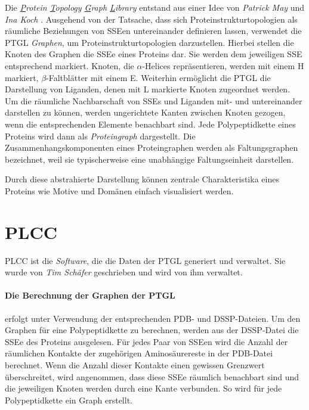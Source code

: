 \documentclass{report}
\begin{document}
Die \textit{\underline{P}rotein \underline{T}opology \underline{G}raph \underline{L}ibrary} entstand aus einer Idee von \textit{Patrick May} und \textit{Ina Koch} \cite{ptgl1}. Ausgehend von der Tatsache, dass sich Proteinstrukturtopologien als r\"aumliche Beziehungen von SSEen untereinander definieren lassen, verwendet die PTGL \emph{Graphen}, um Proteinstrukturtopologien darzustellen.
Hierbei stellen die Knoten des Graphen die SSEe eines Proteins dar. Sie werden dem jeweiligen SSE entsprechend markiert. Knoten, die $\alpha$-Helices repr\"asentieren, werden mit einem H markiert, $\beta$-Faltbl\"atter mit einem E. Weiterhin erm\"oglicht die PTGL die Darstellung von Liganden, \cite{vplg} denen mit L markierte Knoten zugeordnet werden. Um die r\"aumliche Nachbarschaft von SSEs und Liganden mit- und untereinander darstellen zu k\"onnen, werden ungerichtete Kanten zwischen Knoten gezogen, wenn die entsprechenden Elemente benachbart sind. Jede Polypeptidkette eines Proteins wird dann als \emph{Proteingraph} dargestellt. Die Zusammenhangskomponenten eines Proteingraphen werden als Faltungsgraphen bezeichnet, weil sie typischerweise eine unabh\"angige Faltungseinheit darstellen.

Durch diese abstrahierte Darstellung k\"onnen zentrale Charakteristika eines Proteins wie Motive und Dom\"anen einfach visualisiert werden.


\section{PLCC}

PLCC ist die \textit{Software}, die die Daten der PTGL generiert und verwaltet. Sie wurde von \textit{Tim Sch\"afer} geschrieben und  wird von ihm verwaltet.


\paragraph{Die Berechnung der Graphen der PTGL}

erfolgt unter Verwendung der entsprechenden PDB- und DSSP-Dateien. Um den Graphen f\"ur eine Polypeptidkette zu berechnen, werden aus der DSSP-Datei die SSEe des Proteins ausgelesen. F\"ur jedes Paar von SSEen wird die Anzahl der r\"aumlichen Kontakte der zugeh\"origen Aminos\"aurereste in der PDB-Datei berechnet. Wenn die Anzahl dieser Kontakte einen gewissen Grenzwert \"uberschreitet, wird angenommen, dass diese SSEe r\"aumlich benachbart sind und die jeweiligen Knoten werden durch eine Kante verbunden. So wird f\"ur jede Polypeptidkette ein Graph erstellt.
\end{document}
